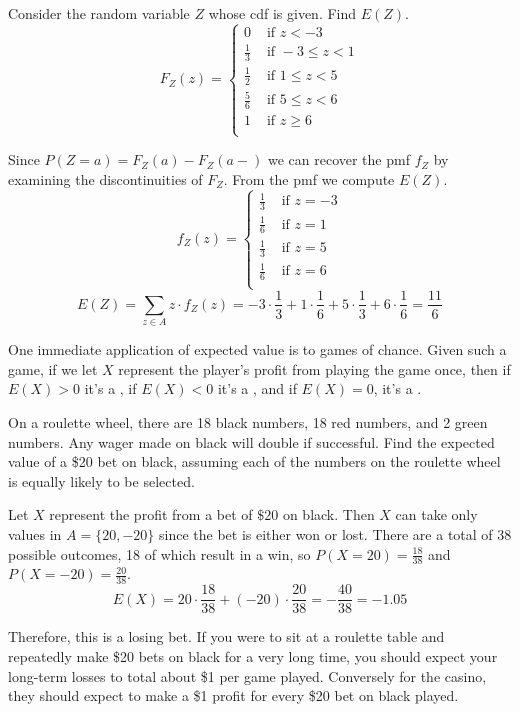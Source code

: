 \begin{example}
Consider the random variable $Z$ whose cdf is given. Find $E(Z)$.
\renewcommand*{\arraystretch}{1.35}
$$F_Z(z) = \left\{
\begin{array}{cl}
      0 & \text{ if \ } z < -3 \\
			\frac{1}{3} & \text{ if \ } -3 \leq z < 1 \\
			\frac{1}{2} & \text{ if \ } 1 \leq z < 5 \\
			\frac{5}{6} & \text{ if \ } 5 \leq z < 6 \\
      1 & \text{ if \ } z \geq 6 \\ \end{array} 
\right.$$
\renewcommand*{\arraystretch}{1}

Since $P(Z = a) = F_Z(a) - F_Z(a-)$ we can recover the pmf $f_Z$ by examining the discontinuities of $F_Z$. From the pmf we compute $E(Z)$.
\renewcommand*{\arraystretch}{1.35}
$$f_Z(z) = \left\{
\begin{array}{cl}
			\frac{1}{3} & \text{ if \ } z = -3 \\
			\frac{1}{6} & \text{ if \ } z = 1 \\
			\frac{1}{3} & \text{ if \ } z = 5 \\
      \frac{1}{6} & \text{ if \ } z = 6 \\ \end{array} 
\right.$$
\vspace{1em}
$$E(Z) = \sum_{z \in A} z \cdot f_Z(z) = -3 \cdot \frac{1}{3} + 1 \cdot \frac{1}{6} + 5 \cdot \frac{1}{3} + 6 \cdot \frac{1}{6} = \frac{11}{6}$$
\renewcommand*{\arraystretch}{1}
\end{example}

One immediate application of expected value is to games of chance. Given such a game, if we let $X$ represent the player's profit from playing the game once, then if $E(X) > 0$ it's a , if $E(X) < 0$ it's a , and if $E(X) = 0$, it's a . 

\begin{example}
On a roulette wheel, there are 18 black numbers, 18 red numbers, and 2 green numbers. Any wager made on black will double if successful. Find the expected value of a \$20 bet on black, assuming each of the numbers on the roulette wheel is equally likely to be selected.

Let $X$ represent the profit from a bet of $\$20$ on black. Then $X$ can take only values in $A = \{20, -20\}$ since the bet is either won or lost. There are a total of 38 possible outcomes, 18 of which result in a win, so $P(X = 20) = \frac{18}{38}$ and $P(X = -20) = \frac{20}{38}$.
$$E(X) = 20 \cdot \frac{18}{38} + (-20) \cdot \frac{20}{38} = -\frac{40}{38} = -1.05$$

Therefore, this is a losing bet. If you were to sit at a roulette table and repeatedly make \$20 bets on black for a very long time, you should expect your long-term losses to total about \$1 per game played. Conversely for the casino, they should expect to make a \$1 profit for every \$20 bet on black played.
\end{example}

